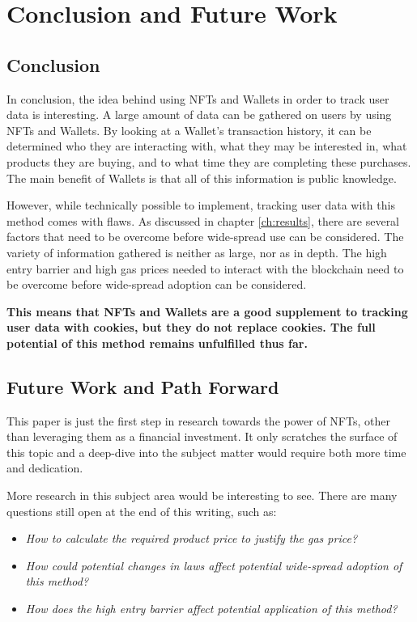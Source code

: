 \chapter{Conclusion and Future Work}
\label{ch:conclusion}

%
%
\section{Conclusion}
\label{sec:conclusion:conclusion}
In conclusion, the idea behind using NFTs and Wallets in order to track user data is interesting. A large amount of data can be gathered on users by using NFTs and Wallets. By looking at a Wallet's transaction history, it can be determined who they are interacting with, what they may be interested in, what products they are buying, and to what time they are completing these purchases. The main benefit of Wallets is that all of this information is public knowledge.

However, while technically possible to implement, tracking user data with this method comes with flaws. As discussed in chapter \ref{ch:results}, there are several factors that need to be overcome before wide-spread use can be considered. The variety of information gathered is neither as large, nor as in depth. The high entry barrier and high gas prices needed to interact with the blockchain need to be overcome before wide-spread adoption can be considered.

\textbf{This means that NFTs and Wallets are a good supplement to tracking user data with cookies, but they do not replace cookies. The full potential of this method remains unfulfilled thus far.}



%
%
\section{Future Work and Path Forward}
\label{sec:conclusion:futureWork}
This paper is just the first step in research towards the power of NFTs, other than leveraging them as a financial investment. It only scratches the surface of this topic and a deep-dive into the subject matter would require both more time and dedication.

More research in this subject area would be interesting to see. There are many questions still open at the end of this writing, such as:
\begin{itemize}
	\item \textit{How to calculate the required product price to justify the gas price?}
	\item \textit{How could potential changes in laws affect potential wide-spread adoption of this method?}
	\item \textit{How does the high entry barrier affect potential application of this method?}
\end{itemize}

